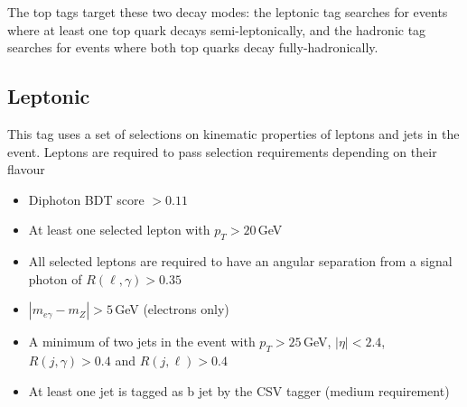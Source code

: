 The top tags target these two decay modes: the leptonic tag searches for \ttH events where at least one top quark decays semi-leptonically, and the hadronic tag searches for \ttH events where both top quarks decay fully-hadronically. 

\subsection{\ttH Leptonic}
This tag uses a set of selections on kinematic properties of leptons and jets in the event. 
Leptons are required to pass selection requirements depending on their flavour
\begin{itemize}[leftmargin=.5in,noitemsep]
    \item Diphoton BDT score $> 0.11$ 
    \item At least one selected lepton with $p_{T} > 20$\,GeV
    \item All selected leptons are required to have an angular separation from a signal photon of $R(\ell,\gamma) > 0.35$
    \item $|m_{e\gamma} - m_{Z}| > 5$\,GeV (electrons only)
    \item A minimum of two jets in the event with $p_{T} > 25$\,GeV, $|\eta| < 2.4$, $R(j,\gamma) > 0.4$ and $R(j,\ell) > 0.4$
    \item At least one jet is tagged as b jet by the CSV tagger (medium requirement)
\end{itemize}


